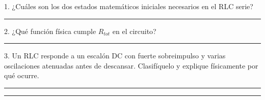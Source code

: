 \documentclass[11pt, a4paper]{article}
\begin{document}
\vspace{0.4cm}
\begin{tcolorbox}[colback=red!5!white, colframe=red!70!black, title=\textbf{Exit Ticket: Verificación Rápida de Comprensión}]
1. ¿Cuáles son los dos estados matemáticos iniciales necesarios en el RLC serie? \rule{4cm}{0.4pt} \par
\vspace{0.3cm}
2. ¿Qué función física cumple $R_{tot}$ en el circuito? \rule{6cm}{0.4pt} \par
\vspace{0.3cm}
3. Un RLC responde a un escalón DC con fuerte sobreimpulso y varias oscilaciones atenuadas antes de descansar. Clasifíquelo y explique físicamente por qué ocurre. \par
\vspace{0.2cm}
\noindent\rule{\textwidth}{0.4pt} \par
\vspace{0.3cm}
\noindent\rule{\textwidth}{0.4pt}
\end{tcolorbox}
\end{document}
